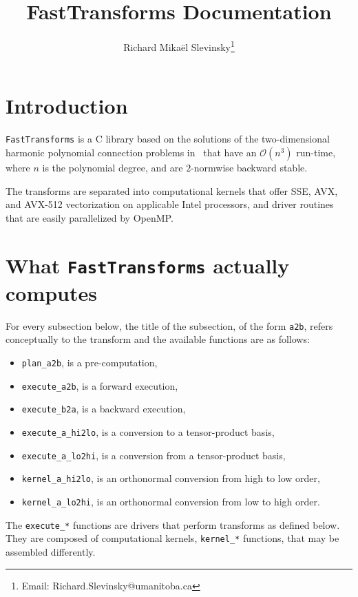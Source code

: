 \documentclass{article}
\begin{document}
\title{FastTransforms Documentation}

\author{Richard Mika\"el Slevinsky\thanks{Email: Richard.Slevinsky@umanitoba.ca}}

\maketitle

\section{Introduction}

{\tt FastTransforms} is a C library based on the solutions of the two-dimensional harmonic polynomial connection problems in~\cite{Slevinsky-ACHA-17,Slevinsky-1711-07866} that have an $\mathcal{O}(n^3)$ run-time, where $n$ is the polynomial degree, and are $2$-normwise backward stable.

The transforms are separated into computational kernels that offer SSE, AVX, and AVX-512 vectorization on applicable Intel processors, and driver routines that are easily parallelized by OpenMP.

\section{What {\tt FastTransforms} actually computes}

For every subsection below, the title of the subsection, of the form \verb+a2b+, refers conceptually to the transform and the available functions are as follows:
\begin{itemize}
\item \verb+plan_a2b+, is a pre-computation,
\item \verb+execute_a2b+, is a forward execution,
\item \verb+execute_b2a+, is a backward execution,
\item \verb+execute_a_hi2lo+, is a conversion to a tensor-product basis,
\item \verb+execute_a_lo2hi+, is a conversion from a tensor-product basis,
\item \verb+kernel_a_hi2lo+, is an orthonormal conversion from high to low order,
\item \verb+kernel_a_lo2hi+, is an orthonormal conversion from low to high order.
\end{itemize}
The \verb+execute_*+ functions are drivers that perform transforms as defined below. They are composed of computational kernels, \verb+kernel_*+ functions, that may be assembled differently.
\end{document}
